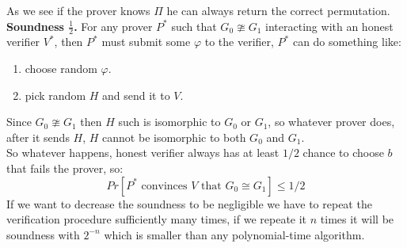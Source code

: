 \documentclass[12pt,a4paper]{article}
\begin{document}
As we see if the prover knows $\Pi$ he can always return the correct permutation.\\
\textbf{Soundness $\frac{1}{2}$.}
For any prover $P^*$ such that $G_0 \ncong G_1$ interacting with an honest verifier $V^*$, then $P^*$ must submit some $\varphi$ to the verifier, $P^*$ can do something like:
\begin{enumerate}
	\item 
	\begin{enumerate}
choose random $\varphi$.
	\end{enumerate}
\item
\begin{enumerate}
pick random $H$ and send it to $V$.
\end{enumerate}
\end{enumerate}
Since $G_0\ncong G_1$ then $H$ such is isomorphic to  $G_0$ or  $G_1$, so whatever prover does, after it sends $H$, $H$ cannot be isomorphic to both $G_0$ and $G_1$.\\
So whatever happens, honest verifier always has at least $1/2$ chance to choose $b$ that fails the prover, so:
$$Pr[P^* \text{ convinces } V \text{ that }G_0 \cong G_1]\leq 1/2$$
If we want to decrease the soundness to be negligible we have to repeat the verification procedure sufficiently many times, if we repeate it $n$ times it will be soundness with $2^{-n}$ which is smaller than any polynomial-time algorithm.
\end{document}
